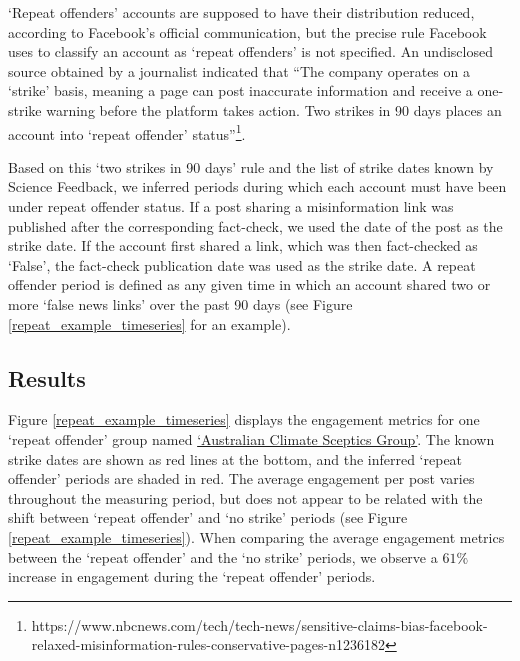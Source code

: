 \documentclass[11pt,a4paper]{article}
\begin{document}
`Repeat offenders' accounts are supposed to have their distribution reduced, according to Facebook's official communication, but the precise rule Facebook uses to classify an account as `repeat offenders' is not specified. 
An undisclosed source obtained by a journalist indicated that ``The company operates on a `strike' basis, meaning a page can post inaccurate information and receive a one-strike warning before the platform takes action. 
Two strikes in 90 days places an account into `repeat offender' status''\footnote{https://www.nbcnews.com/tech/tech-news/sensitive-claims-bias-facebook-relaxed-misinformation-rules-conservative-pages-n1236182}.

Based on this `two strikes in 90 days' rule and the list of strike dates known by Science Feedback, we inferred periods during which each account must have been under repeat offender status. 
If a post sharing a misinformation link was published after the corresponding fact-check, we used the date of the post as the strike date. 
If the account first shared a link, which was then fact-checked as `False', the fact-check publication date was used as the strike date. 
A repeat offender period is defined as any given time in which an account shared two or more `false news links' over the past 90 days (see Figure \ref{repeat_example_timeseries} for an example).

\subsection{Results}

Figure \ref{repeat_example_timeseries} displays the engagement metrics for one `repeat offender' group named \href{https://www.facebook.com/groups/108655705888371/}{`Australian Climate Sceptics Group'}. 
The known strike dates are shown as red lines at the bottom, and the inferred ‘repeat offender’ periods are shaded in red. 
The average engagement per post varies throughout the measuring period, but does not appear to be related with the shift between `repeat offender' and `no strike' periods (see Figure \ref{repeat_example_timeseries}).
When comparing the average engagement metrics between the `repeat offender' and the `no strike' periods, we observe a $61\%$ increase in engagement during the `repeat offender' periods.
\end{document}
